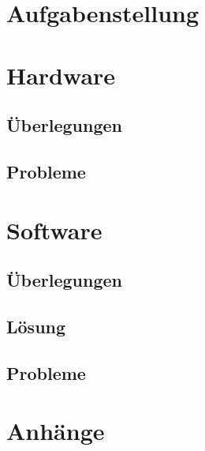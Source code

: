 \section{Aufgabenstellung}


\section{Hardware}
\subsection{Überlegungen}


\subsection{Probleme}


\newpage
\section{Software}
\subsection{Überlegungen}


\subsection{Lösung}


\subsection{Probleme}


%

\newpage
\section{Anhänge}


